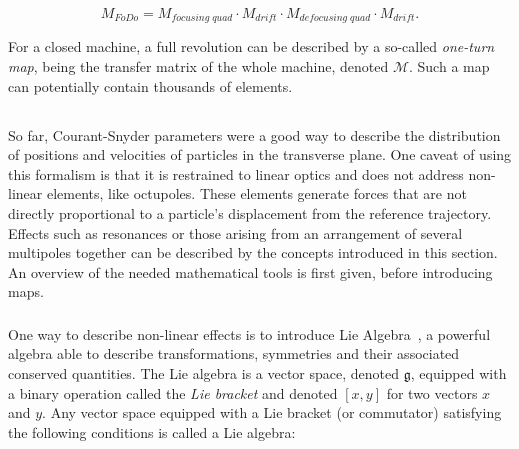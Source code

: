\begin{equation}
    M_{FoDo} = M_{focusing\;quad} \cdot M_{drift} \cdot M_{defocusing\;quad} \cdot M_{drift}.
\end{equation}

For a closed machine, a full revolution can be described by a so-called \textit{one-turn map}, being
the transfer matrix of the whole machine, denoted $\mathcal{M}$. Such a map can potentially contain
thousands of elements.


\subsection{}

So far, Courant-Snyder parameters were a good way to describe the distribution of positions and
velocities of particles in the transverse plane. One caveat of using this formalism is that it is 
restrained to linear optics and does not address non-linear elements, like octupoles. These elements
generate forces that are not directly proportional to a particle's displacement from the reference
trajectory.
Effects such as resonances or those arising from an arrangement of several multipoles together can
be described by the concepts introduced in this section.
An overview of the needed mathematical tools is first given, before introducing maps.

\subsubsection{}

One way to describe non-linear effects is to introduce Lie Algebra~\cite{dragt_overview_2013}, a
powerful algebra able to describe transformations, symmetries and their associated conserved
quantities. 
The Lie algebra is a vector space, denoted $\mathfrak{g}$, equipped with a binary operation called
the \textit{Lie bracket} and denoted $[x, y]$ for two vectors $x$ and $y$. Any vector space equipped
with a Lie bracket (or commutator) satisfying the following conditions is called a Lie
algebra:

